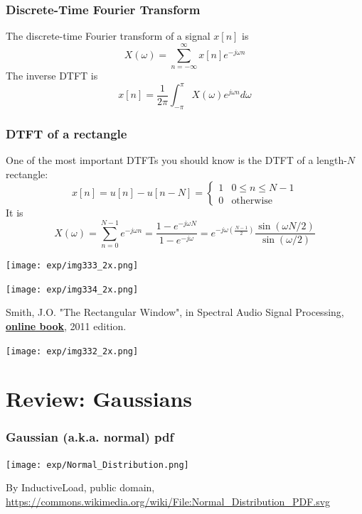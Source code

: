 \documentclass{beamer}
\begin{document}
\begin{frame}
  \frametitle{Discrete-Time Fourier Transform}
  The discrete-time Fourier transform of a signal $x[n]$ is
  \[
  X(\omega) = \sum_{n=-\infty}^\infty x[n]e^{-j\omega n}
  \]
  The inverse DTFT is
  \[
  x[n] = \frac{1}{2\pi}\int_{-\pi}^\pi X(\omega)e^{j\omega n}d\omega
  \]
\end{frame}

\begin{frame}
  \frametitle{DTFT of a rectangle}

  One of the most important DTFTs you should know is the DTFT of a
  length-$N$ rectangle:
  \[
  x[n] = u[n]-u[n-N]=\begin{cases}
  1 & 0\le n \le N-1\\
  0 & \mbox{otherwise}
  \end{cases}
  \]
  It is
  \[
  X(\omega)  = \sum_{n=0}^{N-1} e^{-j\omega n} =\frac{1-e^{-j\omega N}}{1-e^{-j\omega}}
  = e^{-j\omega\left(\frac{N-1}{2}\right)}\frac{\sin(\omega N/2)}{\sin(\omega/2)}
  \]
\end{frame}

\begin{frame}
  \centerline{\texttt{[image: exp/img333\_2x.png]}}
  \centerline{\texttt{[image: exp/img334\_2x.png]}}
  \begin{tiny}
    Smith, J.O. "The Rectangular Window", in 
    Spectral Audio Signal Processing,
    \href{http://ccrma.stanford.edu/~jos/sasp/Rectangular_Window.html}{\bf\color{blue}online book},
    2011 edition.
  \end{tiny}
\end{frame}

\begin{frame}
  \centerline{\texttt{[image: exp/img332\_2x.png]}}
\end{frame}


\section[Gaussians]{Review: Gaussians}
\setcounter{subsection}{1}

\begin{frame}
  \frametitle{Gaussian (a.k.a. normal) pdf}
  \centerline{\texttt{[image: exp/Normal\_Distribution.png]}}
  \begin{tiny}
    By InductiveLoad, public domain,
    \url{https://commons.wikimedia.org/wiki/File:Normal_Distribution_PDF.svg}
  \end{tiny}
\end{frame}
\end{document}
